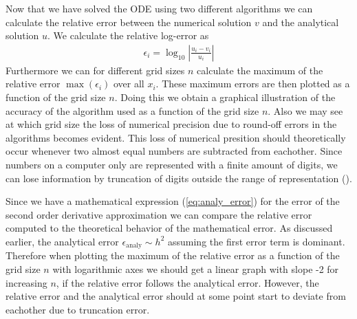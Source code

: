 \documentclass[twocolumn]{aastex62}
\begin{document}
Now that we have solved the ODE using two different algorithms we can calculate the relative error between the numerical solution $v$ and the analytical solution $u$. We calculate the relative log-error as 
\begin{align}
	\epsilon_i = \log_{10} \left|\frac{u_i - v_i}{u_i}\right|
	\label{eq:rel_error}
\end{align}
Furthermore we can for different grid sizes $n$ calculate the maximum of the relative error $\max(\epsilon_i)$ over all $x_i$. These maximum errors are then plotted as a function of the grid size $n$. Doing this we obtain a graphical illustration of the accuracy of the algorithm used as a function of the grid size $n$. Also we may see at which grid size the loss of numerical precision due to round-off errors in the algorithms becomes evident. This loss of numerical presition should theoretically occur whenever two almost equal numbers are subtracted from eachother. Since numbers on a computer only are represented with a finite amount of digits, we can lose information by truncation of digits outside the range of representation (\cite{Morken:2017}).

Since we have a mathematical expression (\ref{eq:analy_error}) for the error of the second order derivative approximation we can compare the relative error computed to the theoretical behavior of the mathematical error. As discussed earlier, the analytical error $\epsilon_\text{analy} \sim h^2$ assuming the first error term is dominant. Therefore when plotting the maximum of the relative error as a function of the grid size $n$ with logarithmic axes we should get a linear graph with slope -2 for increasing $n$, if the relative error follows the analytical error. However, the relative error and the analytical error should at some point start to deviate from eachother due to truncation error. 
\end{document}

